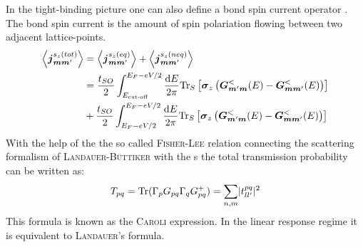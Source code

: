 In the tight-binding picture one can also define a bond spin current operator \cite{EPL.80.47001}. The bond spin current is the amount of spin polariation flowing between two adjacent lattice-points.
\begin{align}
\left< \boldsymbol{j}_{\boldsymbol{m}\boldsymbol{m}'}^{s_z(tot)} \right> &=\left< \boldsymbol{j}_{\boldsymbol{m}\boldsymbol{m}'}^{s_z(eq)} \right>+ \left< \boldsymbol{j}_{\boldsymbol{m}\boldsymbol{m}'}^{s_z(neq)} \right>\\
	&=\frac{t_{SO}}{2} \int_{E_{\text{cut-off}}}^{E_F-eV/2} \frac{\text{d}E}{2 \pi} \text{Tr}_S \left[\boldsymbol{\sigma}_z\left(\boldsymbol{G}^<_{\boldsymbol{m}'\boldsymbol{m}}(E)- \boldsymbol{G}^<_{\boldsymbol{m}\boldsymbol{m}'}(E)\right)\right]\\
	&+\frac{t_{SO}}{2} \int_{E_F-eV/2}^{E_F-eV/2} \frac{\text{d}E}{2 \pi} \text{Tr}_S \left[\boldsymbol{\sigma}_z\left(\boldsymbol{G}^<_{\boldsymbol{m}'\boldsymbol{m}}(E)- \boldsymbol{G}^<_{\boldsymbol{m}\boldsymbol{m}'}(E)\right)\right]
	\label{eqn:gfnccurrent}
\end{align}
With the help of the the so called \textsc{Fisher-Lee} relation \cite{PhysRevB.23.6851} connecting the scattering formalism of \textsc{Landauer-B\"uttiker} with the \gfnc s the total transmission probability can be written as:
\begin{align}
T_{pq} = \text{Tr}(\Gamma_p G_{pq} \Gamma_q G^+_{pq}) = \sum_{n,m} \lvert t^{pq}_{ll'}\rvert^2
\label{eqn:transmissionfunction}
\end{align}
This formula is known as the \textsc{Caroli} expression. In the linear response regime it is equivalent to \textsc{Landauer}'s formula\cite{PhysRevB.72.035450}.
